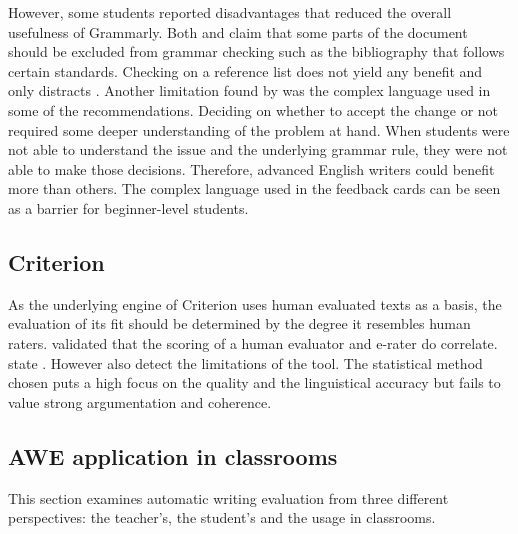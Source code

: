 \documentclass[runningheads]{llncs}
\let\OldTextregistered\textregistered
\renewcommand{\textregistered}{\OldTextregistered\xspace}
\begin{document}
However, some students reported disadvantages that reduced the overall usefulness of Grammarly\textregistered. Both \textcite{ventayen_graduate_2018} and  \textcite{nova_utilizing_2018} claim that some parts of the document should be excluded from grammar checking such as the bibliography that follows certain standards. Checking on a reference list does not yield any benefit and only distracts \citep{ventayen_graduate_2018, nova_utilizing_2018}. Another limitation found by \textcite{cavaleri_you_2016} was the complex language used in some of the recommendations. Deciding on whether to accept the change or not required some deeper understanding of the problem at hand. When students were not able to understand the issue and the underlying grammar rule, they were not able to make those decisions. Therefore, advanced English writers could benefit more than others. The complex language used in the feedback cards can be seen as a barrier for beginner-level students. 

\subsection{Criterion\textregistered}
As the underlying engine of Criterion\textregistered uses human evaluated texts as a basis, the evaluation of its fit should be determined by the degree it resembles human raters. \textcite{weigle_validation_2010} validated that the scoring of a human evaluator and e-rater\textregistered do correlate. \citeauthor{lim_review_2012} state . However \textcite{lim_review_2012} also detect the limitations of the tool. The statistical method chosen puts a high focus on the quality and the linguistical accuracy but fails to value strong argumentation and coherence. 

\subsection{AWE application in classrooms}
This section examines automatic writing evaluation from three different perspectives: the teacher's, the student's and the usage in classrooms. 
\end{document}

